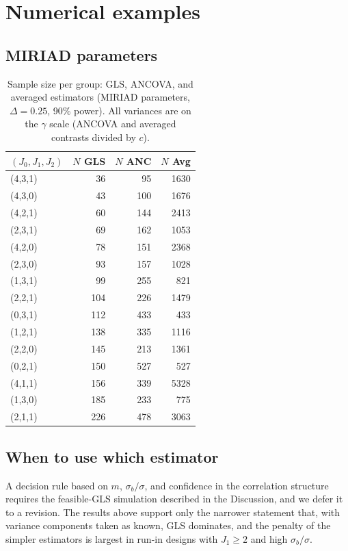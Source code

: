 \documentclass[
  11pt,
]{article}
\begin{document}
\section{Numerical examples}\label{numerical-examples}

\subsection{MIRIAD parameters}\label{miriad-parameters}

\begin{table}

\caption{\label{tab:miriad-comparison}Sample size per group: GLS, ANCOVA, and averaged estimators (MIRIAD parameters, $\Delta=0.25$, 90\% power). All variances are on the $\gamma$ scale (ANCOVA and averaged contrasts divided by $c$).}
\centering
\begin{tabular}[t]{lrrr}
\toprule
$(J_0,J_1,J_2)$ & $N$ GLS & $N$ ANC & $N$ Avg\\
\midrule
(4,3,1) & 36 & 95 & 1630\\
(4,3,0) & 43 & 100 & 1676\\
(4,2,1) & 60 & 144 & 2413\\
(2,3,1) & 69 & 162 & 1053\\
(4,2,0) & 78 & 151 & 2368\\
\addlinespace
(2,3,0) & 93 & 157 & 1028\\
(1,3,1) & 99 & 255 & 821\\
(2,2,1) & 104 & 226 & 1479\\
(0,3,1) & 112 & 433 & 433\\
(1,2,1) & 138 & 335 & 1116\\
\addlinespace
(2,2,0) & 145 & 213 & 1361\\
(0,2,1) & 150 & 527 & 527\\
(4,1,1) & 156 & 339 & 5328\\
(1,3,0) & 185 & 233 & 775\\
(2,1,1) & 226 & 478 & 3063\\
\bottomrule
\end{tabular}
\end{table}

\subsection{When to use which estimator}\label{when-to-use-which-estimator}

A decision rule based on \(m\), \(\sigma_b/\sigma\), and
confidence in the correlation structure requires the
feasible-GLS simulation described in the Discussion, and
we defer it to a revision. The results above support
only the narrower statement that, with variance
components taken as known, GLS dominates, and the
penalty of the simpler estimators is largest in run-in
designs with \(J_1 \ge 2\) and high \(\sigma_b/\sigma\).
\end{document}
